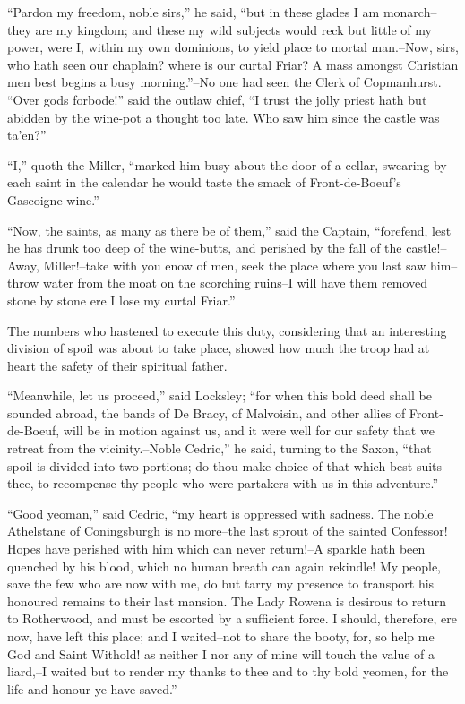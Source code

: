 ``Pardon my freedom, noble sirs,'' he said, ``but in these glades I am
monarch--they are my kingdom; and these my wild subjects would reck but
little of my power, were I, within my own dominions, to yield place to
mortal man.--Now, sirs, who hath seen our chaplain? where is our curtal
Friar? A mass amongst Christian men best begins a busy morning.''--No
one had seen the Clerk of Copmanhurst. ``Over gods forbode!'' said the
outlaw chief, ``I trust the jolly priest hath but abidden by the
wine-pot a thought too late. Who saw him since the castle was ta'en?''

``I,'' quoth the Miller, ``marked him busy about the door of a cellar,
swearing by each saint in the calendar he would taste the smack of
Front-de-Boeuf's Gascoigne wine.''

``Now, the saints, as many as there be of them,'' said the Captain,
``forefend, lest he has drunk too deep of the wine-butts, and perished
by the fall of the castle!--Away, Miller!--take with you enow of men,
seek the place where you last saw him--throw water from the moat on the
scorching ruins--I will have them removed stone by stone ere I lose my
curtal Friar.''

The numbers who hastened to execute this duty, considering that an
interesting division of spoil was about to take place, showed how much
the troop had at heart the safety of their spiritual father.

``Meanwhile, let us proceed,'' said Locksley; ``for when this bold deed
shall be sounded abroad, the bands of De Bracy, of Malvoisin, and other
allies of Front-de-Boeuf, will be in motion against us, and it were well
for our safety that we retreat from the vicinity.--Noble Cedric,'' he
said, turning to the Saxon, ``that spoil is divided into two portions;
do thou make choice of that which best suits thee, to recompense thy
people who were partakers with us in this adventure.''

``Good yeoman,'' said Cedric, ``my heart is oppressed with sadness. The
noble Athelstane of Coningsburgh is no more--the last sprout of the
sainted Confessor! Hopes have perished with him which can never
return!--A sparkle hath been quenched by his blood, which no human
breath can again rekindle! My people, save the few who are now with me,
do but tarry my presence to transport his honoured remains to their last
mansion. The Lady Rowena is desirous to return to Rotherwood, and must
be escorted by a sufficient force. I should, therefore, ere now, have
left this place; and I waited--not to share the booty, for, so help me
God and Saint Withold! as neither I nor any of mine will touch the value
of a liard,--I waited but to render my thanks to thee and to thy bold
yeomen, for the life and honour ye have saved.''

